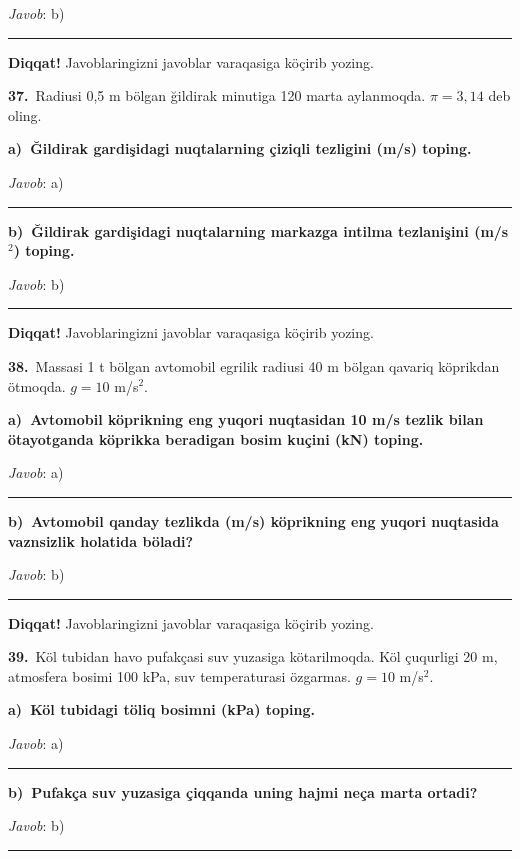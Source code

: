 \documentclass[11pt,a4paper]{article}
\newcommand{\blank}{\rule{5cm}{0.4pt}}
\begin{document}
\noindent\textit{Javob}: b)\ \blank\par
\medskip\noindent\textbf{Diqqat!} Javoblaringizni javoblar varaqasiga köçirib yozing.\par\vspace{10pt}
\noindent\textbf{37.}\ Radiusi 0,5 m bölgan ğildirak minutiga 120 marta aylanmoqda. $\pi=3{,}14$ deb oling.\par\smallskip
\medskip\noindent\textbf{a)\ Ğildirak gardişidagi nuqtalarning çiziqli tezligini (m/s) toping.}\par
\noindent\textit{Javob}: a)\ \blank\par
\medskip\noindent\textbf{b)\ Ğildirak gardişidagi nuqtalarning markazga intilma tezlanişini (m/s$^2$) toping.}\par
\noindent\textit{Javob}: b)\ \blank\par
\medskip\noindent\textbf{Diqqat!} Javoblaringizni javoblar varaqasiga köçirib yozing.\par\vspace{10pt}
\noindent\textbf{38.}\ Massasi 1 t bölgan avtomobil egrilik radiusi 40 m bölgan qavariq köprikdan ötmoqda. $g=10$ m/s$^2$.\par\smallskip
\medskip\noindent\textbf{a)\ Avtomobil köprikning eng yuqori nuqtasidan 10 m/s tezlik bilan ötayotganda köprikka beradigan bosim kuçini (kN) toping.}\par
\noindent\textit{Javob}: a)\ \blank\par
\medskip\noindent\textbf{b)\ Avtomobil qanday tezlikda (m/s) köprikning eng yuqori nuqtasida vaznsizlik holatida böladi?}\par
\noindent\textit{Javob}: b)\ \blank\par
\medskip\noindent\textbf{Diqqat!} Javoblaringizni javoblar varaqasiga köçirib yozing.\par\vspace{10pt}
\noindent\textbf{39.}\ Köl tubidan havo pufakçasi suv yuzasiga kötarilmoqda. Köl çuqurligi 20 m, atmosfera bosimi 100 kPa, suv temperaturasi özgarmas. $g=10$ m/s$^2$.\par\smallskip
\medskip\noindent\textbf{a)\ Köl tubidagi töliq bosimni (kPa) toping.}\par
\noindent\textit{Javob}: a)\ \blank\par
\medskip\noindent\textbf{b)\ Pufakça suv yuzasiga çiqqanda uning hajmi neça marta ortadi?}\par
\noindent\textit{Javob}: b)\ \blank\par
\end{document}
